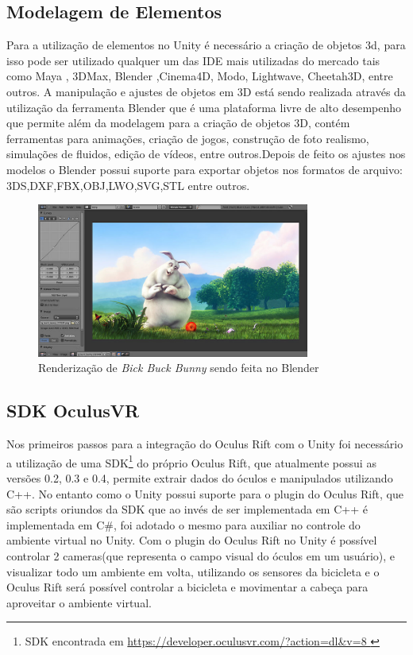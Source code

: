 \subsection{Modelagem de Elementos} %
\label{sub:modelagem}
	Para a utilização de elementos no Unity é necessário a criação de objetos 3d, para isso pode ser utilizado qualquer um das IDE mais utilizadas do mercado tais como Maya , 3DMax, Blender ,Cinema4D, Modo, Lightwave, Cheetah3D, entre outros. A manipulação e ajustes de objetos em 3D está sendo realizada através da utilização da ferramenta Blender  que é uma plataforma livre de alto desempenho que permite além da modelagem para a criação de objetos 3D, contém ferramentas para animações, criação de jogos, construção de foto realismo, simulações de fluidos, edição de vídeos, entre outros.Depois de feito os ajustes nos modelos o Blender possui suporte para exportar objetos nos formatos de arquivo: 3DS,DXF,FBX,OBJ,LWO,SVG,STL entre outros.

\begin{figure}[h]
  \centering
  \includegraphics[width=0.8\textwidth]
      {figuras/blender.png}
  \caption{Renderização de \textit{Bick Buck Bunny} sendo feita no Blender}
  \label{coordenadas-rift}
\end{figure}

\subsection{SDK OculusVR}
\label{sub:sdk_ovr}
      Nos primeiros passos para a integração do Oculus Rift com o Unity foi necessário a utilização de uma SDK\footnote{ SDK encontrada em \url{https://developer.oculusvr.com/?action=dl&v=8 }} do próprio Oculus Rift, que atualmente possui as versões 0.2, 0.3 e 0.4, permite extrair dados do óculos e manipulados utilizando C++. No entanto como o Unity possui suporte para o plugin do Oculus Rift, que são scripts oriundos da SDK que ao invés de ser implementada em C++ é implementada em C\#, foi adotado o mesmo para auxiliar no controle do ambiente virtual no Unity.
     Com o plugin do Oculus Rift no Unity é possível controlar 2 cameras(que representa o campo visual do óculos em um usuário), e visualizar todo um ambiente em volta, utilizando os sensores da bicicleta e o Oculus Rift será possível controlar a bicicleta e movimentar a cabeça para aproveitar o ambiente virtual.

